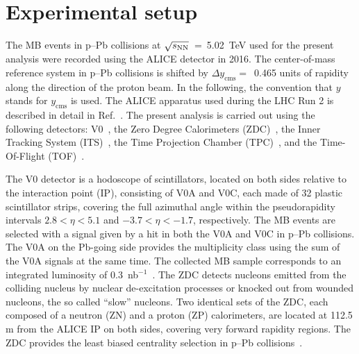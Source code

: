 \section{Experimental setup}
\label{sec:setup}
The MB events in p--Pb collisions at $\sqrt{s_{\rm NN}}$~=~5.02~TeV used for the present analysis were recorded using the ALICE detector in 2016. The center-of-mass reference system in p--Pb collisions is shifted by $\Delta y_{\mathrm{cms}} =$~0.465 units of rapidity along the direction of the proton beam. In the following, the convention that $y$ stands for $y_{\mathrm{cms}}$ is used. The ALICE apparatus used during the LHC Run 2 is described in detail in Ref.~\cite{Abelev:2014ffa}. The present analysis is carried out using the following detectors: V0~\cite{ALICE:2013axi}, the Zero Degree Calorimeters (ZDC)~\cite{Cortese:2019nnv}, the Inner Tracking System (ITS)~\cite{ALICE:2010tia}, the Time Projection Chamber (TPC)~\cite{Alme:2010ke}, and the Time-Of-Flight (TOF)~\cite{Jacazio:2018slq}. 

The V0 detector is a hodoscope of scintillators, located on both sides relative to the interaction point (IP), consisting of V0A and V0C, each made of 32 plastic scintillator strips, covering the full azimuthal angle within the pseudorapidity intervals $2.8 < \eta < 5.1$ and $-3.7 < \eta < -1.7$, respectively. The MB events are selected with a signal given by a hit in both the V0A and V0C in p--Pb collisions. The V0A on the Pb-going side provides the multiplicity class using the sum of the V0A signals at the same time. The collected MB sample corresponds to an integrated luminosity of 0.3~nb$^{-1}$~\cite{ALICE:2014gvw}. The ZDC detects nucleons emitted from the colliding nucleus by nuclear de-excitation processes or knocked out from wounded nucleons, the so called “slow” nucleons. Two identical sets of the ZDC, each composed of a neutron (ZN) and a proton (ZP) calorimeters, are located at 112.5 m from the ALICE IP on both sides, covering very forward rapidity regions. The ZDC provides the least biased centrality selection in p--Pb collisions~\cite{ALICE:2014xsp}.

